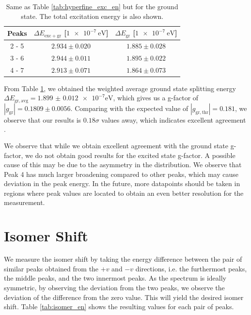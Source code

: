 \documentclass[a4paper]{report}
\numberwithin{equation}{section}
\begin{document}
\begin{table}[!ht]
    \centering
    \begin{tabular}{|c|c|c|}
    \hline
        Peaks & $\Delta E_\mathrm{exc + gr}$ [$\SI{1e-7}{\electronvolt}$] & $\Delta E_\mathrm{gr}$ [$\SI{1e-7}{\electronvolt}$]\\ \hline
        2 - 5 & $2.934 \pm 0.020$ & $1.885 \pm 0.028$\\ \hline
        3 - 6 & $2.944 \pm 0.011$ & $1.895 \pm 0.022$\\ \hline
        4 - 7 & $2.913 \pm 0.071$ & $1.864 \pm 0.073$\\ \hline
    \end{tabular}
    \caption{Same as Table \ref{tab:hyperfine_exc_en} but for the ground state. The total excitation energy is also shown.}
    \label{tab:hyperfine_gr_en}
\end{table}

From Table \ref{tab:hyperfine_gr_en}, we obtained the weighted average ground state splitting energy $\Delta E_{\mathrm{gr, avg}} = \num[scientific-notation=true]{1.899(12)e-7}\si{\electronvolt}$, 
which gives us a g-factor of $| g_\mathrm{gr} | = 0.1809 \pm 0.0056$. Comparing with the expected value of $| g_\mathrm{gr, thr} | = 0.181$, 
we observe that our results is $0.18\sigma$ values away, which indicates excellent agreement \cite{VANIN2007}.\par 

We observe that while we obtain excellent agreement with the ground state g-factor, we do not obtain good results for the excited 
state g-factor. A possible cause of this may be due to the asymmetry in the distribution. We observe that Peak 4 has much larger 
broadening compared to other peaks, which may cause deviation in the peak energy. In the future, more datapoints should be taken in 
regions where peak values are located to obtain an even better resolution for the measurement.

\section{Isomer Shift}

We measure the isomer shift by taking the energy difference between the pair of similar peaks obtained from the $+v$ and $-v$
directions, i.e. the furthermost peaks, the middle peaks, and the two innermost peaks. As the spectrum is ideally symmetric, 
by observing the deviation from the two peaks, we observe the deviation of the difference from the zero value. This will yield the 
desired isomer shift. Table \ref{tab:isomer_en} shows the resulting values for each pair of peaks. 
\end{document}
